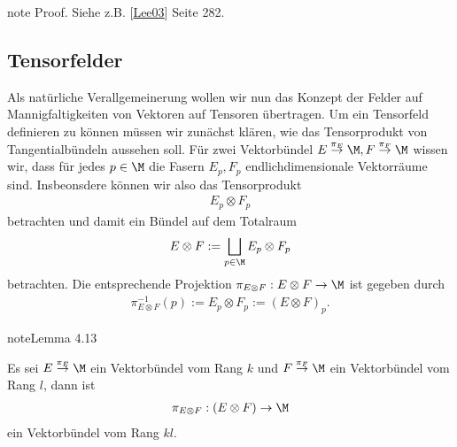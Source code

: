 \documentclass[letterpaper,10pt,german]{jupyterBook}
\begin{document}
\begin{sphinxadmonition}{note}
\sphinxAtStartPar
Proof. Siehe z.B. {[}\hyperlink{cite.references:id18}{Lee03}{]} Seite 282.
\end{sphinxadmonition}


\subsection{Tensorfelder}
\label{\detokenize{manifolds/tangential:tensorfelder}}
\sphinxAtStartPar
Als natürliche Verallgemeinerung wollen wir nun das Konzept der Felder auf Mannigfaltigkeiten von Vektoren auf Tensoren übertragen. Um ein Tensorfeld definieren zu können müssen wir zunächst klären, wie das Tensorprodukt von Tangentialbündeln aussehen soll. Für zwei Vektorbündel \(E\overset{\pi_E}{\to}{\M}, F\overset{\pi_F}{\to}{\M}\) wissen wir, dass für jedes \(p\in\M\) die Fasern \(E_p, F_p\) endlichdimensionale Vektorräume sind. Insbeonsdere können wir also das Tensorprodukt
\begin{equation*}
\begin{split}E_p\otimes F_p\end{split}
\end{equation*}
\sphinxAtStartPar
betrachten und damit ein Bündel auf dem Totalraum
\begin{equation*}
\begin{split}E\otimes F:= \bigsqcup_{p\in\M} E_p\otimes F_p\end{split}
\end{equation*}
\sphinxAtStartPar
betrachten. Die entsprechende Projektion \(\pi_{E\otimes F}:E\otimes F\to\M\) ist gegeben durch
\begin{equation*}
\begin{split}\pi_{E\otimes F}^{-1}(p):= E_p\otimes F_p := (E\otimes F)_p.\end{split}
\end{equation*}\label{manifolds/tangential:lem:tensorbundle}
\begin{sphinxadmonition}{note}{Lemma 4.13}



\sphinxAtStartPar
Es sei \(E\overset{\pi_E}{\to}{\M}\) ein Vektorbündel vom Rang \(k\) und \(F\overset{\pi_F}{\to}{\M}\) ein Vektorbündel vom Rang \(l\), dann ist
\begin{equation*}
\begin{split}\pi_{E\otimes F}:(E\otimes F)\to \M\end{split}
\end{equation*}
\sphinxAtStartPar
ein Vektorbündel vom Rang \(kl\).
\end{sphinxadmonition}
\end{document}
